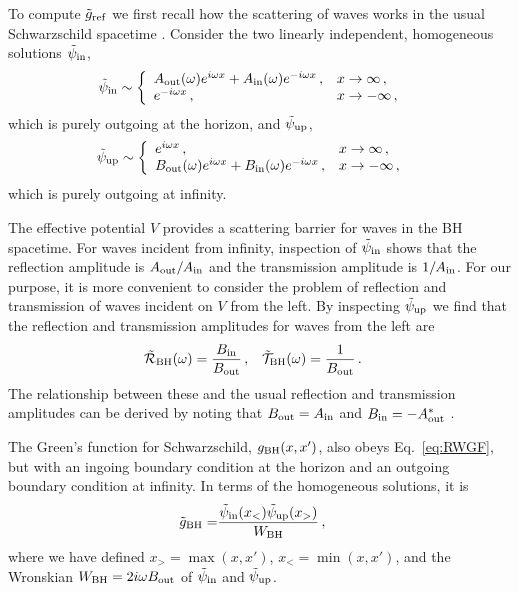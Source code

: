 \begin{refsection}
To compute $\tilde g_{\rm ref}$ we first recall how the scattering of waves works in the usual Schwarzschild spacetime \cite{Frolov:1998wf}.
Consider the two linearly independent, homogeneous solutions $\tilde \psi_{\rm in}$,
\begin{align}
\tilde \psi_{\rm in} & \sim 
\left \{
\begin{array}{ll}
A_{\rm out}(\omega) e^{i \omega x} + A_{\rm in}(\omega) e^{-i\omega x}\,, & x \to \infty \,, \\
e^{-i\omega x}\,, & x \to - \infty \,, \\
\end{array} \right. \label{eq:psiin}
\end{align}
which is purely outgoing at the horizon, and $\tilde \psi_{\rm up}$,
\begin{align}
\tilde \psi_{\rm up} & \sim 
\left \{
\begin{array}{ll}
e^{i\omega x} \,, & x \to \infty \,, \\
B_{\rm out}(\omega) e^{i \omega x} + B_{\rm in}(\omega) e^{-i\omega x}\,, & x \to - \infty \,, \\
\end{array} \right. \label{eq:psiup}
\end{align}
which is purely outgoing at infinity.

The effective potential $V$ provides a scattering barrier for waves in the BH spacetime. 
For waves incident from infinity, inspection of $\tilde \psi_{\rm in}$ shows that the reflection amplitude is $A_{\rm out}/A_{\rm in}$ and the transmission amplitude is $1/A_{\rm in}$.
For our purpose, it is more convenient to consider the problem of reflection and transmission of waves incident on $V$ from the left. By inspecting $\tilde \psi_{\rm up}$ we find that the reflection and transmission amplitudes for waves from the left are 
\begin{align}
\label{eq:RTAmplitudes}
\tilde{\mathcal R}_{\rm BH} (\omega) & = \frac{B_{\rm in}}{B_{\rm out}} \,, & \tilde{\mathcal T}_{\rm BH}(\omega) & = \frac{1}{B_{\rm out}} \,.
\end{align}
The relationship between these and the usual reflection and transmission amplitudes can be derived by noting that $B_{\rm out} = A_{\rm in}$ and $B_{\rm in} = - A_{\rm out}^*$ \cite{Frolov:1998wf} .

The Green's function for Schwarzschild, $g_{\rm BH}(x,x')$, also obeys Eq.~\eqref{eq:RWGF}, but with an ingoing boundary condition at the horizon and an outgoing boundary condition at infinity.
In terms of the homogeneous solutions, it is
\begin{align}
\tilde g_{\rm BH} =& \frac{\tilde \psi_{\rm in}(x_<) \tilde \psi_{\rm up}(x_>)}{W_{\rm BH}} \,, \label{eq:gBH}
\end{align}
where we have defined $x_> = \max (x,x')$, $x_< = \min (x,x')$, and the Wronskian $W_{\rm BH} = 2 i \omega B_{\rm out}$ of $\tilde \psi_{\rm in}$ and $\tilde \psi_{\rm up}$.


\end{refsection}
